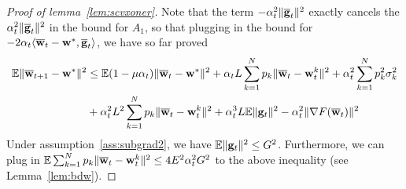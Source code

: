\begin{proof}[Proof of lemma~\ref{lem:scvxoner}]
	Note that the term $-\alpha_{t}^{2}\|{\overline{\mathbf{g}}}_{t}\|^{2}$ exactly
	cancels the $\alpha_{t}^{2}\|{\overline{\mathbf{g}}}_{t}\|^{2}$ in the bound
	for $A_{1}$, so that plugging in the bound for $-2\alpha_{t}\langle{\overline{\mathbf{w}}}_{t}-{\mathbf{w}}^{\ast},{\overline{\mathbf{g}}}_{t}\rangle$,
	we have so far proved 
	\begin{align*}
	\mathbb{E}\|{\overline{\mathbf{w}}}_{t+1}-{\mathbf{w}}^{\ast}\|^{2} & \leq\mathbb{E}(1-\mu\alpha_{t})\|{\overline{\mathbf{w}}}_{t}-{\mathbf{w}}^{\ast}\|^{2}+\alpha_{t}L\sum_{k=1}^{N}p_{k}\|{\overline{\mathbf{w}}}_{t}-{\mathbf{w}}_{t}^{k}\|^{2}+\alpha_{t}^{2}\sum_{k=1}^{N}p_{k}^{2}\sigma_{k}^{2}\\
	& +\alpha_{t}^{2}L^{2}\sum_{k=1}^{N}p_{k}\|{\overline{\mathbf{w}}}_{t}-{\mathbf{w}}_{t}^{k}\|^{2}+\alpha_{t}^{3}L\mathbb{E}\|{\mathbf{g}}_{t}\|^{2}-\alpha_{t}^{2}\|\nabla F({\overline{\mathbf{w}}}_{t})\|^{2}
	\end{align*}
	Under assumption~\ref{ass:subgrad2}, we have $\mathbb{E}\|{\mathbf{g}}_{t}\|^{2}\leq G^{2}$. Furthermore, we can plug in $\mathbb{E}\sum_{k=1}^{N}p_{k}\|{\overline{\mathbf{w}}}_{t}-{\mathbf{w}}_{t}^{k}\|^{2} \leq 4E^{2}\alpha_{t}^{2}G^{2}$ to the above inequality (see Lemma~\ref{lem:bdw}).
	

\end{proof}
